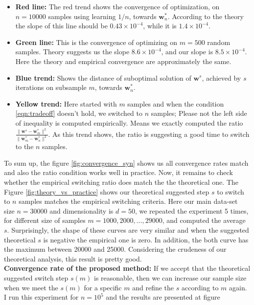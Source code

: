 \documentclass[11pt, a4paper, reqno, twoside]{scrartcl}
\theoremstyle{style}
\newcommand{\wv}{\bm{w}}
\newcommand{\0}{\mathbf{0}} %
\begin{document}
  \begin{itemize}
    \item \textbf{Red line:} The red trend shows the convergence of
    optimization, on $n = 10000$ samples using learning $1/n$, towards
    $\wv_n^*$. According to the theory the slope of this line should be $0.43
    \times 10^{-4}$, while it is $1.4 \times 10^{-4}$. 
    \item \textbf{Green line:} This is the convergence of optimizing on $m =
    500$ random samples. Theory suggests us the slope $8.6\times 10^{-4}$,
    and our slope is $8.5 \times 10^{-4}$. Here the theory and empirical
    convergence are approximately the same. 
    \item \textbf{Blue trend:} Shows the distance of suboptimal solution of
    $\wv^s$, achieved by $s$ iterations on subsample $m$, towards $\wv_n^*$. 
    \item \textbf{Yellow trend:} Here started with $m$ samples and when the
     condition \ref{eqn:tradeoff} doesn't hold, we switched to $n$ samples;
     Please not the left side of inequality is computed empirically. Means we
     exactly computed the ratio $\frac{\|\wv^s - \wv_m^*\|^2}{\|\wv_m^* -
     \wv_n^* \|^2}$. As this trend shows, the ratio is suggesting a good time to
     switch to the $n$ samples. 
  \end{itemize}
To sum up, the figure  \ref{fig:convergence_syn} shows us all convergence rates match and also the ratio
condition works well in practice. Now, it remains to check whether the
empirical switching ratio does match the the theoretical one. The Figure
\ref{fig:theory_vs_practice} shows our theoretical suggested step $s$ to switch to $n$ samples matches the
empirical switching criteria. Here our main data-set size $n = 30000$ and
dimensionality is $d = 50$, we repeated the experiment 5 times, for different 
size of samples $m = 1000,2000,\ldots,29000$, and computed the average $s$.
Surprisingly, the shape of these curves are very similar and when the suggested
theoretical $s$ is negative the empirical one is zero. In addition, the both
curve has the maximum between 20000 and 25000. Considering the crudeness of our
theoretical analysis, this result is pretty good. \\
\textbf{Convergence rate of the proposed method:}
If we accept that the theoretical suggested switch step $s(m)$ is reasonable,
then we can increase our sample size when we meet the $s(m)$ for a specific
$m$ and refine the $s$ according to $m$ again. I run this experiment for
$n=10^5$ and the results are presented at figure
\end{document}
